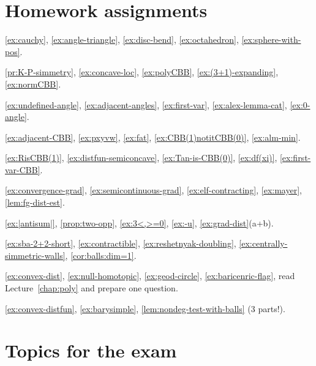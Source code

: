\chapter*{Homework assignments}

\ref{ex:cauchy},
\ref{ex:angle-triangle},
\ref{ex:disc-bend},
\ref{ex:octahedron},
\ref{ex:sphere-with-pos}.

\ref{pr:K-P-simmetry},
\ref{ex:concave-loc},
\ref{ex:polyCBB},
\ref{ex:(3+1)-expanding},
\ref{ex:normCBB}.

\ref{ex:undefined-angle},
\ref{ex:adjacent-angles},
\ref{ex:first-var},
\ref{ex:alex-lemma-cat},
\ref{ex:0-angle}.

\ref{ex:adjacent-CBB},
\ref{ex:pxyvw},
\ref{ex:fat},
\ref{ex:CBB(1)notitCBB(0)},
\ref{ex:alm-min}.

\ref{ex:RisCBB(1)},
\ref{ex:distfun-semiconcave},
\ref{ex:Tan-is-CBB(0)},
\ref{ex:df(xi)},
\ref{ex:first-var-CBB}.

\ref{ex:convergence-grad},
\ref{ex:semicontinuous-grad},
\ref{ex:elf-contracting},
\ref{ex:mayer},
\ref{lem:fg-dist-est}.

\ref{ex:|antisum|},
\ref{prop:two-opp},
\ref{ex:3<,>=0},
\ref{ex:-u},
\ref{ex:grad-dist}(a+b).

\ref{ex:sba-2+2-short},
\ref{ex:contractible},
\ref{ex:reshetnyak-doubling},
\ref{ex:centrally-simmetric-walls},
\ref{cor:balls:dim=1}.

\ref{ex:convex-dist},
\ref{ex:null-homotopic},
\ref{ex:geod-circle},
\ref{ex:baricenric-flag},
read Lecture~\ref{chap:poly} and prepare one question.

\ref{ex:convex-distfun},
\ref{ex:barysimple},
\ref{lem:nondeg-test-with-balls} (3 parts!).

\chapter*{Topics for the exam}


